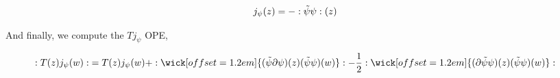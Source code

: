 \begin{align*}
    j_\psi\qty(z)&=-:\tilde\psi\psi:\qty(z)
\end{align*}

And finally, we compute the $Tj_\psi$ OPE,

\begin{align*}
    \cnord{T\qty(z)j_\psi\qty(w)}&=T\qty(z)j_\psi\qty(w)+\cnord{\wick[offset=1.2em]{(\tilde\psi\partial\psi)\qty(z)(\tilde\psi\psi)\qty(w)}}-\frac12\cnord{\wick[offset=1.2em]{(\partial\tilde\psi\psi)\qty(z)(\tilde\psi\psi)\qty(w)}}
\end{align*}

\probitem{}
\probitem{}